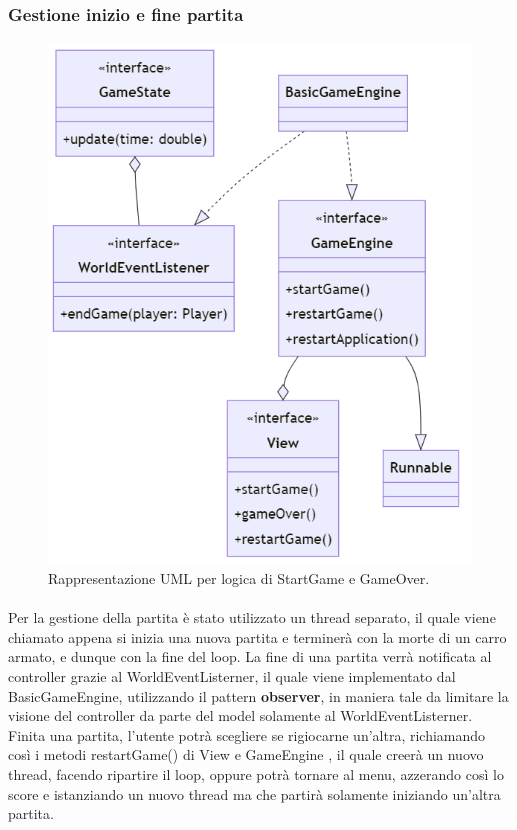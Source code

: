 \documentclass[a4paper,12pt]{report}
\begin{document}
\subsubsection*{Gestione inizio e fine partita}
%
\begin{figure}[H]
	\centering{}
	\includegraphics[scale=0.8]{img/runnable.png}
	\caption{Rappresentazione UML per logica di StartGame e GameOver.}
	\label{img:strategy}
	\end{figure}
%
\paragraph{} Per la gestione della partita è stato utilizzato un thread separato, il quale viene chiamato appena si inizia una nuova partita e terminerà con la morte di un carro armato, e dunque con la fine del loop. La fine di una partita verrà notificata al controller grazie al WorldEventListerner, il quale viene implementato dal BasicGameEngine, utilizzando il pattern \textbf{observer}, in maniera tale da limitare la visione del controller da parte del model solamente al WorldEventListerner.\\
Finita una partita, l’utente potrà scegliere se rigiocarne un’altra, richiamando così i metodi restartGame() di View e GameEngine , il quale creerà un nuovo thread, facendo ripartire il loop, oppure potrà tornare al menu, azzerando così lo score e istanziando un nuovo thread ma che partirà solamente iniziando un’altra partita.
%
\newpage
\end{document}
